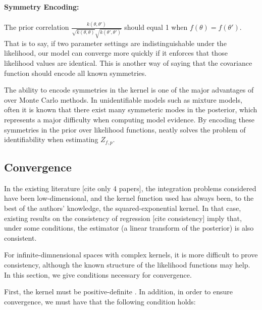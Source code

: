 \paragraph{Symmetry Encoding:} \label{des:pcor1} The prior correlation $\frac{k(\theta, \theta')}{\sqrt{k(\theta, \theta)} \sqrt{k(\theta', \theta')}}$ should equal 1 when $f(\theta) = f(\theta')$. That is to say, if two parameter settings are indistinguishable under the likelihood, our model can converge more quickly if it enforces that those likelihood values are identical.  This is another way of saying that the covariance function should encode all known symmetries. %
%

The ability to encode symmetries in the kernel is one of the major advantages of \bq{} over Monte Carlo methods.  In unidentifiable models such as mixture models, often it is known that there exist many symmeteric modes in the posterior, which represents a major difficulty when computing model evidence.  By encoding these symmetries in the prior over likelihood functions, \bq{} neatly solves the problem of identifiability when estimating $Z_{f,p}$.


\subsection{Convergence}

In the existing \bq{} literature [cite only 4 papers], the integration problems considered have been low-dimensional, and the kernel function used has always been, to the best of the authors' knowledge, the squared-exponential kernel.  In that case, existing results on the consistency of \gp{} regression [cite consistency] imply that, under some conditions, the \bq{} estimator (a linear transform of the \gp{} posterior) is also consistent.  

For infinite-dimnensional spaces with complex kernels, it is more difficult to prove consistency, although the known structure of the likelihood functions may help.  In this section, we give conditions necessary for convergence.

First, the kernel must be positive-definite \cite{rasmussen38gaussian}.  In addition, in order to ensure convergence, we must have that the following condition holds:

